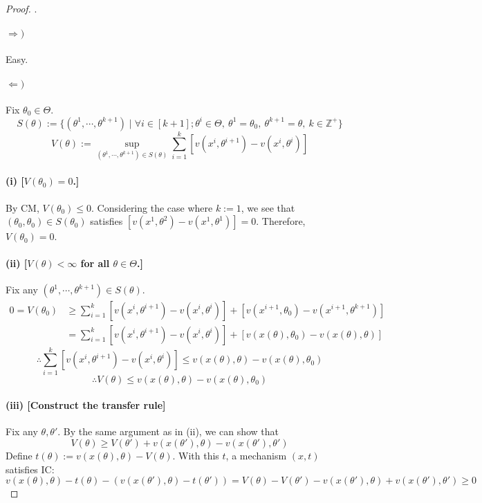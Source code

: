 \documentclass[11pt,a4paper,dvipdfmx]{article}
\theoremstyle{plain}
\newcommand{\Z}{\mathbb{Z}}
\newcommand{\1}{\mathbbm{1}}
\begin{document}
\begin{proof}.
\paragraph{$\Rightarrow)$} Easy.
\paragraph{$\Leftarrow)$}
	Fix $\theta_0 \in \Theta$.
	\[
	S(\theta) := \{(\theta^1, \cdots, \theta^{k+1}) \mid \forall i \in [k+1]; \theta^i \in \Theta, \ \theta^1 = \theta_0, \ \theta^{k+1} = \theta, \ k \in \Z^+ \}
	\]
	\[
	V(\theta) := \sup_{(\theta^1, \cdots, \theta^{k+1}) \in S(\theta)} \sum_{i=1}^k [v(x^{i}, \theta^{i+1}) - v(x^{i}, \theta^{i})]
	\]
	\paragraph{(i) [$V(\theta_0) = 0$.]} By CM, $V(\theta_0) \leq 0$. Considering the case where $k := 1$, we see that $(\theta_0, \theta_0) \in S(\theta_0)$ satisfies $[v(x^1, \theta^2) - v(x^1, \theta^1)] = 0$. Therefore, $V(\theta_0) = 0$.
	
	\paragraph{(ii) [$V(\theta) < \infty$ for all $\theta \in \Theta$.]} Fix any $(\theta^1, \cdots, \theta^{k+1}) \in S(\theta)$.
	\begin{align*}
		0 = V(\theta_0)
		&\geq \sum_{i=1}^k [v(x^{i}, \theta^{i+1}) - v(x^{i}, \theta^{i})] + [v(x^{i+1}, \theta_0) - v(x^{i+1}, \theta^{k+1})] \\
		&= \sum_{i=1}^k [v(x^{i}, \theta^{i+1}) - v(x^{i}, \theta^{i})] + [v(x(\theta), \theta_0) - v(x(\theta), \theta)]
	\end{align*}
	\[
	\therefore 
		\sum_{i=1}^k [v(x^{i}, \theta^{i+1}) - v(x^{i}, \theta^{i})]
		\leq v(x(\theta), \theta) - v(x(\theta), \theta_0)
	\]
	\[
	\therefore 
		V(\theta)
		\leq v(x(\theta), \theta) - v(x(\theta), \theta_0)
	\]
	
	\paragraph{(iii) [Construct the transfer rule]}
	Fix any $\theta, \theta'$. By the same argument as in (ii), we can show that 
	\[
	V(\theta) \geq V(\theta') + v(x(\theta'), \theta) - v(x(\theta'), \theta')
	\]
	Define $t(\theta) := v(x(\theta), \theta) - V(\theta)$. With this $t$, a mechanism $(x,t)$ satisfies IC:
	\[
	v(x(\theta), \theta) - t(\theta) - (v(x(\theta'), \theta) - t(\theta'))
	= V(\theta) - V(\theta') - v(x(\theta'), \theta) + v(x(\theta'), \theta') \geq 0
	\]
\end{proof}
\end{document}
